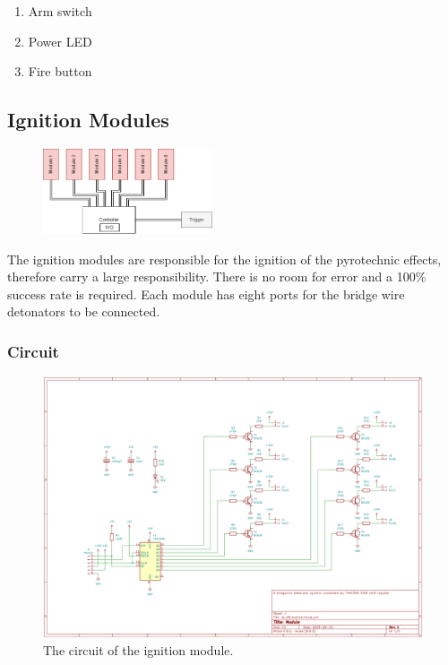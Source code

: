 \begin{enumerate}
	\item Arm switch
	\item Power LED
	\item Fire button
\end{enumerate}

\pagebreak

\subsection{Ignition Modules}
\label{Ignition Modules}

\begin{figure}[!ht]
    \centering
    \includegraphics[width=5cm]{./Figures/concept_modules.png} 
\end{figure}

\noindent The ignition modules are responsible for the ignition of the pyrotechnic effects, therefore carry a large responsibility. There is no room for error and a 100\% success rate is required. Each module has eight ports for the bridge wire detonators to be connected.

\subsubsection{Circuit}

\begin{figure}[!ht]
    \centering
    \includegraphics[width=15cm]{./Figures/module_circuit.png}
    \caption{The circuit of the ignition module.}
    \label{fig:trigger_circuit}     
\end{figure}

